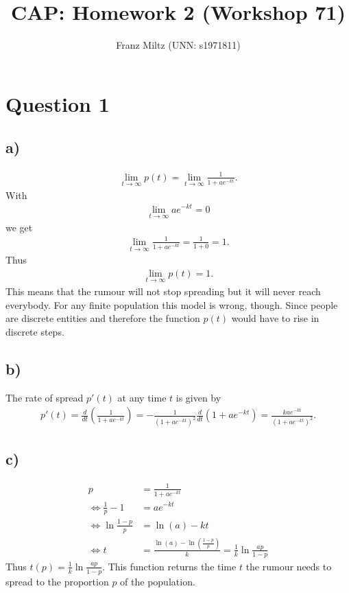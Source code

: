 \documentclass{article}
\title{CAP: Homework 2 (Workshop 71)}
\author{Franz Miltz (UNN: s1971811)}
\begin{document}
\maketitle
\section*{Question 1}
\subsection*{a)}
\begin{align*}
  \lim_{t\to\infty} p(t) = \lim_{t\to\infty} \frac{1}{1+ae^{-kt}}.
\end{align*}
With
\begin{align*}
  \lim_{t\to\infty} ae^{-kt} = 0
\end{align*}
we get
\begin{align*}
  \lim_{t\to\infty}\frac{1}{1+ae^{-kt}}=\frac{1}{1+0}=1.
\end{align*}
Thus
\begin{align*}
  \lim_{t\to\infty}p(t)=1.
\end{align*}
This means that the rumour will not stop spreading but it will never reach everybody.
For any finite population this model is wrong, though.
Since people are discrete entities and therefore the function $p(t)$ would have to rise in discrete steps.
\subsection*{b)}
The rate of spread $p'(t)$ at any time $t$ is given by
\begin{align*}
  p'(t)=\frac{d}{dt}\left(\frac{1}{1+ae^{-kt}}\right)=-\frac{1}{(1+ae^{-kt})^2}\frac{d}{dt}(1+ae^{-kt})
  =\frac{kae^{-kt}}{(1+ae^{-kt})^2}.
\end{align*}
\subsection*{c)}
\begin{align*}
  p&=\frac{1}{1+ae^{-kt}}\\
  \Leftrightarrow \frac{1}{p}-1&=ae^{-kt}\\
  \Leftrightarrow \ln \frac{1-p}{p} &= \ln(a) -kt\\
  \Leftrightarrow t &= \frac{\ln(a)-\ln(\frac{1-p}{p})}{k}=\frac{1}{k}\ln\frac{ap}{1-p}
\end{align*}
Thus $t(p)=\frac{1}{k}\ln \frac{ap}{1-p}$. This function returns the time $t$ the rumour needs to spread to the proportion $p$ of the population.
\end{document}
